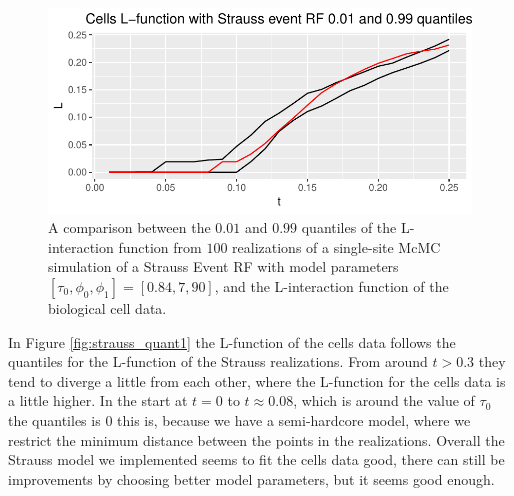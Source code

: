 \begin{figure}
    \centering
    \includegraphics[scale=0.9]{figures/strauss_quant2.pdf}
    \caption{A comparison between the $0.01$ and $0.99$ quantiles of the L-interaction function from $100$ realizations of a single-site McMC simulation of a Strauss Event RF with model parameters $[\tau_0,\phi_0,\phi_1] = [0.84,7,90]$, and the L-interaction function of the biological cell data.}
    \label{fig:strauss_quant2}
\end{figure}

In Figure \ref{fig:strauss_quant1} the L-function of the cells data follows the quantiles for the L-function of the Strauss realizations. From around $t>0.3$ they tend to diverge a little from each other, where the L-function for the cells data is a little higher. In the start at $t=0$ to $t\approx 0.08$, which is around the value of $\tau_0$ the quantiles is $0$ this is, because we have a semi-hardcore model, where we restrict the minimum distance between the points in the realizations. Overall the Strauss model we implemented seems to fit the cells data good, there can still be improvements by choosing better model parameters, but it seems good enough.